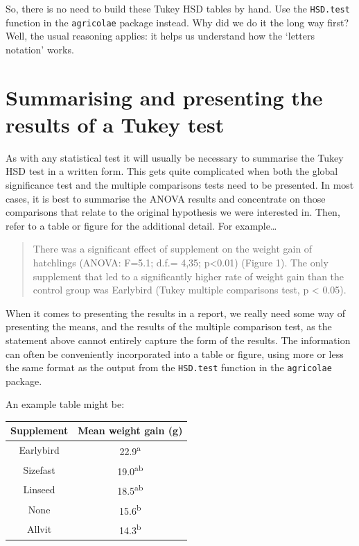 \documentclass[
]{book}
\begin{document}
So, there is no need to build these Tukey HSD tables by hand. Use the \texttt{HSD.test} function in the \texttt{agricolae} package instead. Why did we do it the long way first? Well, the usual reasoning applies: it helps us understand how the `letters notation' works.

\hypertarget{summarise}{%
\section{Summarising and presenting the results of a Tukey test}\label{summarise}}

As with any statistical test it will usually be necessary to summarise the Tukey HSD test in a written form. This gets quite complicated when both the global significance test and the multiple comparisons tests need to be presented. In most cases, it is best to summarise the ANOVA results and concentrate on those comparisons that relate to the original hypothesis we were interested in. Then, refer to a table or figure for the additional detail. For example\ldots{}

\begin{quote}
There was a significant effect of supplement on the weight gain of hatchlings (ANOVA: F=5.1; d.f.= 4,35; p\textless0.01) (Figure 1). The only supplement that led to a significantly higher rate of weight gain than the control group was Earlybird (Tukey multiple comparisons test, p \textless{} 0.05).
\end{quote}

When it comes to presenting the results in a report, we really need some way of presenting the means, and the results of the multiple comparison test, as the statement above cannot entirely capture the form of the results. The information can often be conveniently incorporated into a table or figure, using more or less the same format as the output from the \texttt{HSD.test} function in the \texttt{agricolae} package.

An example table might be:

\begin{longtable}[]{@{}cc@{}}
\toprule()
\textbf{Supplement} & Mean weight gain (g) \\
\midrule()
\endhead
Earlybird & 22.9\textsuperscript{a} \\
Sizefast & 19.0\textsuperscript{ab} \\
Linseed & 18.5\textsuperscript{ab} \\
None & 15.6\textsuperscript{b} \\
Allvit & 14.3\textsuperscript{b} \\
\bottomrule()
\end{longtable}
\end{document}
